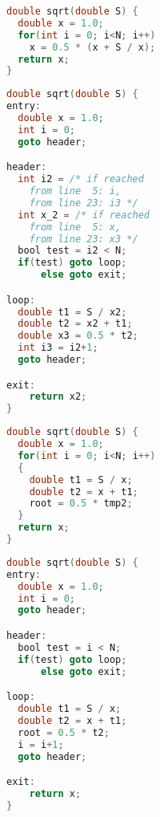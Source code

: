 \begin{minipage}{0.48\textwidth}
\begin{lstlisting}[language=C,captionpos=t,title=
   {{\bf(a)} {} C source function\leftskip=0pt}]
double sqrt(double S) {
  double x = 1.0;
  for(int i = 0; i<N; i++)
    x = 0.5 * (x + S / x);
  return x;
}
\end{lstlisting}
\begin{lstlisting}[language=C,captionpos=t,title=
   {{\bf(d)} {} The SSA property is introduced\leftskip=0pt}]
double sqrt(double S) {
entry:
  double x = 1.0;
  int i = 0;
  goto header;

header:
  int i2 = /* if reached
    from line  5: i,
    from line 23: i3 */
  int x_2 = /* if reached
    from line  5: x,
    from line 23: x3 */
  bool test = i2 < N;
  if(test) goto loop;
      else goto exit;

loop:
  double t1 = S / x2;
  double t2 = x2 + t1;
  double x3 = 0.5 * t2;
  int i3 = i2+1;
  goto header;

exit:
    return x2;
}
\end{lstlisting}
\end{minipage}
\hfill
\begin{minipage}{0.48\textwidth}
\begin{lstlisting}[language=C,basicstyle=\linespread{1.06451612903}\ttfamily,
                   captionpos=t,title=
   {{\bf(b)} {} Complex expressions are broken down\leftskip=0pt}]
double sqrt(double S) {
  double x = 1.0;
  for(int i = 0; i<N; i++)
  {
    double t1 = S / x;
    double t2 = x + t1;
    root = 0.5 * tmp2;
  }
  return x;
}
\end{lstlisting}
\begin{lstlisting}[language=C,basicstyle=\linespread{1.06451612903}\ttfamily,
                   captionpos=t,title=
   {{\bf(c)} {} Structured control flow is expanded\leftskip=0pt}]
double sqrt(double S) {
entry:
  double x = 1.0;
  int i = 0;
  goto header;

header:
  bool test = i < N;
  if(test) goto loop;
      else goto exit;

loop:
  double t1 = S / x;
  double t2 = x + t1;
  root = 0.5 * t2;
  i = i+1;
  goto header;

exit:
    return x;
}
\end{lstlisting}
\end{minipage}
